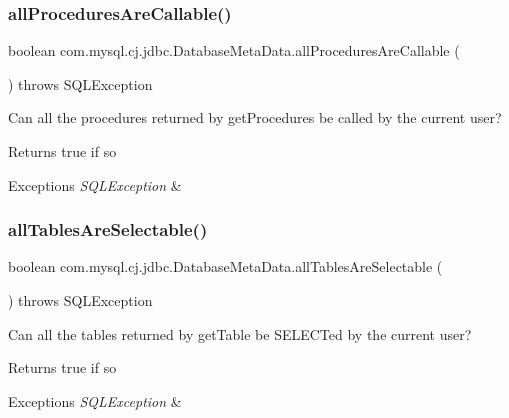 \subsubsection{\texorpdfstring{all\+Procedures\+Are\+Callable()}{allProceduresAreCallable()}}
{\footnotesize\ttfamily boolean com.\+mysql.\+cj.\+jdbc.\+Database\+Meta\+Data.\+all\+Procedures\+Are\+Callable (\begin{DoxyParamCaption}{ }\end{DoxyParamCaption}) throws S\+Q\+L\+Exception}

Can all the procedures returned by get\+Procedures be called by the current user?

\begin{DoxyReturn}{Returns}
true if so 
\end{DoxyReturn}

\begin{DoxyExceptions}{Exceptions}
{\em S\+Q\+L\+Exception} & \\
\hline
\end{DoxyExceptions}
\mbox{\label{classcom_1_1mysql_1_1cj_1_1jdbc_1_1_database_meta_data_a7e50917c8e8311e43527930167d79b50}} 
\subsubsection{\texorpdfstring{all\+Tables\+Are\+Selectable()}{allTablesAreSelectable()}}
{\footnotesize\ttfamily boolean com.\+mysql.\+cj.\+jdbc.\+Database\+Meta\+Data.\+all\+Tables\+Are\+Selectable (\begin{DoxyParamCaption}{ }\end{DoxyParamCaption}) throws S\+Q\+L\+Exception}

Can all the tables returned by get\+Table be S\+E\+L\+E\+C\+Ted by the current user?

\begin{DoxyReturn}{Returns}
true if so 
\end{DoxyReturn}

\begin{DoxyExceptions}{Exceptions}
{\em S\+Q\+L\+Exception} & \\
\hline
\end{DoxyExceptions}
\mbox{\label{classcom_1_1mysql_1_1cj_1_1jdbc_1_1_database_meta_data_acadecc234640e9cc54b2730537aa4482}} 
